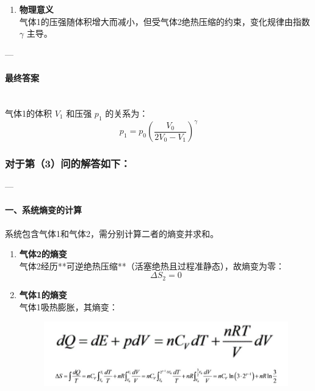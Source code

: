 \documentclass{article}
\begin{document}
{\begin{enumerate}
    \item \textbf{物理意义}  \\
    气体1的压强随体积增大而减小，但受气体2绝热压缩的约束，变化规律由指数 \( \gamma \) 主导。
\end{enumerate}

---

\paragraph*{最终答案} \mbox{} \\

气体1的体积 \( V_1 \) 和压强 \( p_1 \) 的关系为：  
\[
\boxed{
p_1 = p_0 \left( \frac{V_0}{2V_0 - V_1} \right)^\gamma
}
\]

\subsubsection*{对于第（3）问的解答如下：}

---

\paragraph*{一、系统熵变的计算}

系统包含气体1和气体2，需分别计算二者的熵变并求和。

\begin{enumerate}
    \item \textbf{气体2的熵变}  \\
    {\color{red}气体2经历**可逆绝热压缩**（活塞绝热且过程准静态），故熵变为零}：  
    \[
    \Delta S_2 = 0
    \]

    \item \textbf{气体1的熵变}  \\
    气体1吸热膨胀，其熵变：  
    \begin{figure}[H]
        \centering
        \includegraphics[width=1\linewidth]{Screenshot_20250416_201806.jpg}
    \end{figure}
\end{enumerate}




}
\end{document}
